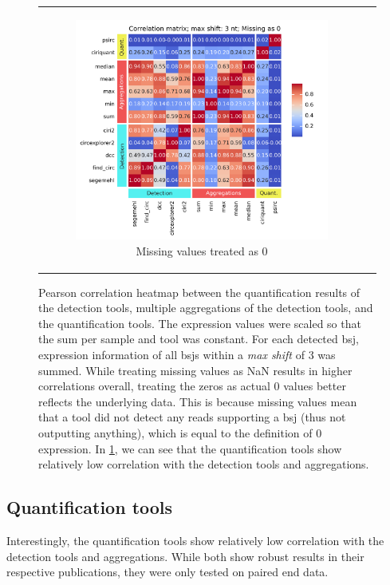 \begin{figure}[ht]
\begin{tabular}{cc}
\begin{subfigure}{0.5\textwidth}
            \includegraphics[width=\linewidth]{chapters/4_results_and_discussion/figures/quantification/correlation_heatmap_3_0.png}
            \caption{Missing values treated as 0}
            \label{fig:correlation_heatmap_3_0}
        \end{subfigure}
    \end{tabular}
    \caption{Pearson correlation heatmap between the quantification results of
        the detection tools, multiple aggregations of the detection tools, and
        the quantification tools.
        The expression values were scaled so that the sum per sample and tool was
        constant.
        For each detected \gls{bsj}, expression information of all \gls{bsj}s within a
        \textit{max shift} of 3 was summed.
        While treating missing values as NaN results in higher correlations overall,
        treating the zeros as actual 0 values better reflects the underlying data.
        This is because missing values mean that a tool did not detect any reads
        supporting a \gls{bsj} (thus not outputting anything), which is equal to the
        definition of 0 expression.
        In \cref{fig:correlation_heatmap_3_0}, we can see that the quantification tools
        show relatively low correlation with the detection tools and aggregations.
    } \label{fig:correlation_heatmap} \end{figure}

\subsection{Quantification tools}
Interestingly, the quantification tools show relatively low correlation with
the detection tools and aggregations.
While both show robust results in their respective publications, they were only
tested on paired end data\supercite{zhang_accurate_2020,yu_quantifying_2021}.

